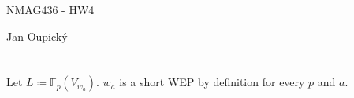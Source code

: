 \documentclass[12pt, a4paper]{article}
\begin{document}
\begin{center}
\large NMAG436 - HW4

\normalsize Jan Oupický
\end{center}
\vspace{1\baselineskip}

\section{}
Let $L \coloneqq \mathbb{F}_p(V_{w_a})$. $w_a$ is a short WEP by definition for every $p$ and $a$. 
\end{document}
